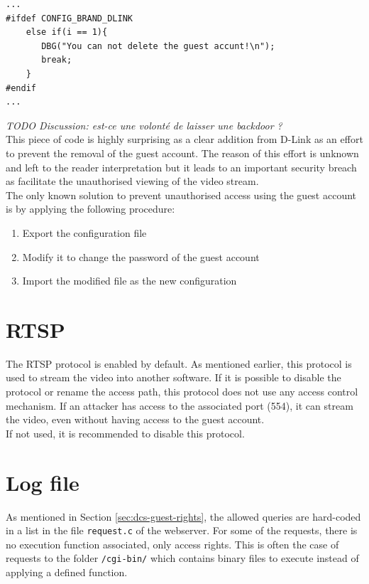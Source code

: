 \begin{verbatim}
...
#ifdef CONFIG_BRAND_DLINK
    else if(i == 1){
       DBG("You can not delete the guest accunt!\n");
       break;
    }
#endif
...
\end{verbatim}

\emph{TODO Discussion: est-ce une volonté de laisser une backdoor ?}\\
This piece of code is highly surprising as a clear addition from D-Link as an effort to prevent the removal of the guest account.
The reason of this effort is unknown and left to the reader interpretation but it leads to an important security breach as facilitate the unauthorised viewing of the video stream.\\

The only known solution to prevent unauthorised access using the guest account is by applying the following procedure:
\begin{enumerate}
\item Export the configuration file
\item Modify it to change the password of the guest account
\item Import the modified file as the new configuration
\end{enumerate}


\section{RTSP}
\label{sec:dcs-rtsp}

The RTSP protocol is enabled by default.
As mentioned earlier, this protocol is used to stream the video into another software.
If it is possible to disable the protocol or rename the access path, this protocol does not use any access control mechanism.
If an attacker has access to the associated port (554), it can stream the video, even without having access to the guest account.\\

If not used, it is recommended to disable this protocol.

\section{Log file}
\label{sec:dcs-log}

As mentioned in Section \ref{sec:dcs-guest-rights}, the allowed queries are hard-coded in a list in the file \texttt{request.c} of the webserver.
For some of the requests, there is no execution function associated, only access rights.
This is often the case of requests to the folder \texttt{/cgi-bin/} which contains binary files to execute instead of applying a defined function.\\

